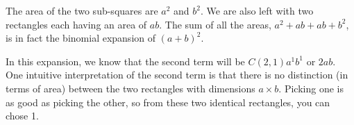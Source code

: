 \documentclass{article}
\begin{document}
\par\noindent The area of the two sub-squares are \(a^{2}\) and \(b^{2}\). We are also left with two rectangles each having an area of \(ab\). The sum of all the areas, \(a^{2} + ab + ab + b^{2} \), is in fact the binomial expansion of \((a+b)^{2}\). 
\newline
\par\noindent In this expansion, we know that the second term will be \(C(2,1)a^{1}b^{1}\) or \(2ab\). One intuitive interpretation of the second term is that there is no distinction (in terms of area) between the two rectangles with dimensions \(a \times b\). Picking one is as good as picking the other, so from these two identical rectangles, you can chose 1.
\end{document}
